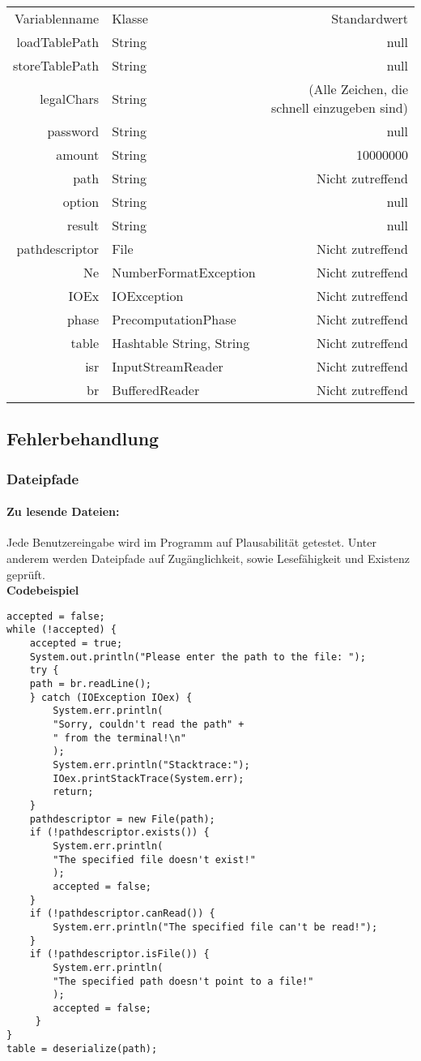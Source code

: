 \documentclass[11pt]{article}
\begin{document}
  \begin{tabular}{rlr}
  Variablenname & Klasse & Standardwert \\
    loadTablePath & String & null \\
  storeTablePath & String & null \\
  legalChars & String & (Alle Zeichen, die schnell einzugeben sind)\\
  password & String & null \\
  amount & String & 10000000 \\
  path & String & Nicht zutreffend \\
  option & String & null \\
  result & String & null \\
  pathdescriptor & File & Nicht zutreffend\\
  Ne & NumberFormatException & Nicht zutreffend \\
  IOEx & IOException & Nicht zutreffend \\
  phase & PrecomputationPhase & Nicht zutreffend \\
  table & Hashtable String, String & Nicht zutreffend \\
  isr & InputStreamReader & Nicht zutreffend \\
  br & BufferedReader & Nicht zutreffend \\
  
  \end{tabular}
  \subsection{Fehlerbehandlung}
  \subsubsection{Dateipfade}
  \paragraph{Zu lesende Dateien:} 
  Jede Benutzereingabe wird im Programm auf Plausabilität getestet. 
  Unter anderem werden Dateipfade auf Zugänglichkeit, sowie Lesefähigkeit und Existenz geprüft.\\
  \textbf{Codebeispiel}
\begin{lstlisting}[caption=Überprüfung eines Dateipfads, label=lst:PathValidation, basicstyle=\tiny]
accepted = false;
while (!accepted) {
	accepted = true;
    System.out.println("Please enter the path to the file: ");
    try {
    path = br.readLine();
    } catch (IOException IOex) {
    	System.err.println(
    	"Sorry, couldn't read the path" + 
    	" from the terminal!\n"
    	);
    	System.err.println("Stacktrace:");
    	IOex.printStackTrace(System.err);
    	return;
    }
    pathdescriptor = new File(path);
    if (!pathdescriptor.exists()) {
    	System.err.println(
    	"The specified file doesn't exist!"
    	);
    	accepted = false;
    }
    if (!pathdescriptor.canRead()) {
		System.err.println("The specified file can't be read!");
    }
    if (!pathdescriptor.isFile()) {
    	System.err.println(
    	"The specified path doesn't point to a file!"
    	);
     	accepted = false;
     }
}
table = deserialize(path);
\end{lstlisting}
\end{document}
